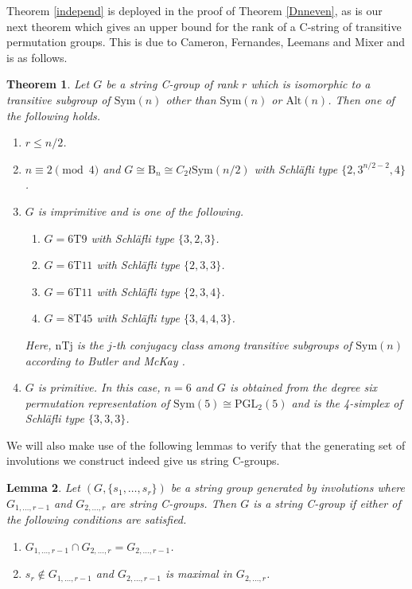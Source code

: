 \documentclass{amsart}
\numberwithin{equation}{section}
\theoremstyle{plain} %
\newtheorem{theorem}{Theorem}[section]
\newtheorem{lemma}[theorem]{Lemma}
\begin{document}
Theorem \ref{independ} is deployed in the proof of Theorem \ref{Dnneven}, as is our next theorem which gives an upper bound for the rank of a C-string of transitive permutation groups. This is due to Cameron, Fernandes, Leemans and Mixer and is as follows.
	

\begin{theorem}{\cite[Theorem 1.2]{transrank}} \label{transrank}
Let $G$ be a string C-group of rank $r$ which is isomorphic to a transitive subgroup of $\mathrm{Sym}(n)$ other than $\mathrm{Sym}(n)$ or $\mathrm{Alt}(n)$. Then one of the following holds.
\begin{enumerate}
\item [(i)] $r \leq n/2$.
\item [(ii)]$n \equiv 2 \pmod 4$ and $G \cong \mathrm{B}_n \cong C_2 \wr \mathrm{Sym}(n/2)$ with Schl\"{a}fli type $\{2,3^{n/2-2},4\}$.
\item [(iii)] $G$ is imprimitive and is one of the following.
\begin{enumerate}
\item [(a)]$G=\mathrm{6T9}$ with Schl\"{a}fli type $\{3,2,3\}$.
\item [(b)]$G=\mathrm{6T11}$ with Schl\"{a}fli type $\{2,3,3\}$.
\item [(c)]$G=\mathrm{6T11}$ with Schl\"{a}fli type $\{2,3,4\}$.
\item [(d)]$G=\mathrm{8T45}$ with Schl\"{a}fli type $\{3,4,4,3\}$.
\end{enumerate}
Here, $\mathrm{nTj}$ is the $j$-th conjugacy class among transitive subgroups of $\mathrm{Sym}(n)$ according to Butler and McKay \cite{butlermckay}.
\item [(iv)]$G$ is primitive. In this case, $n=6$ and $G$ is obtained from the degree six permutation representation of $\mathrm{Sym}(5) \cong \mathrm{PGL}_2(5)$ and is the 4-simplex of Schl\"{a}fli type $\{3,3,3\}$.
\end{enumerate}
\end{theorem}


We will also make use of the following lemmas to verify that the generating set of involutions we construct indeed give us string C-groups.

\begin{lemma}{\cite[2E16(a) and 11A10]{arpbible}} \label{ip}
Let $(G,\{ s_1,\dots,s_r \})$ be a string group generated by involutions where $G_{1,\dots,r-1}$ and $G_{2,\dots,r}$ are string C-groups. Then $G$ is a string C-group if either of the following conditions are satisfied.
\begin{enumerate}
\item[(i)] $G_{1,\dots,r-1} \cap G_{2,\dots,r} = G_{2,\dots,r-1}$.
\item[(ii)] $s_r \notin G_{1,\dots,r-1}$ and $G_{2,\dots,r-1}$ is maximal in $G_{2,\dots,r}$. 
\end{enumerate}
\end{lemma}
\end{document}

